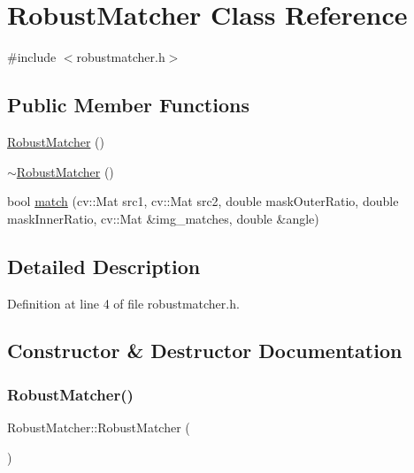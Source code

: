 \hypertarget{class_robust_matcher}{}\section{Robust\+Matcher Class Reference}
\label{class_robust_matcher}


{\ttfamily \#include $<$robustmatcher.\+h$>$}

\subsection*{Public Member Functions}
\begin{DoxyCompactItemize}
\item 
\mbox{\hyperlink{class_robust_matcher_a78641d08f99564cdf67a7a3f8d544f71}{Robust\+Matcher}} ()
\item 
\mbox{\hyperlink{class_robust_matcher_ae8831ade1c296513fcad9764a05d3328}{$\sim$\+Robust\+Matcher}} ()
\item 
bool \mbox{\hyperlink{class_robust_matcher_a00bcb865bcc240ec0df38cecf5243f5e}{match}} (cv\+::\+Mat src1, cv\+::\+Mat src2, double mask\+Outer\+Ratio, double mask\+Inner\+Ratio, cv\+::\+Mat \&img\+\_\+matches, double \&angle)
\end{DoxyCompactItemize}


\subsection{Detailed Description}


Definition at line 4 of file robustmatcher.\+h.



\subsection{Constructor \& Destructor Documentation}
\mbox{\label{class_robust_matcher_a78641d08f99564cdf67a7a3f8d544f71}} 
\subsubsection{\texorpdfstring{Robust\+Matcher()}{RobustMatcher()}}
{\footnotesize\ttfamily Robust\+Matcher\+::\+Robust\+Matcher (\begin{DoxyParamCaption}{ }\end{DoxyParamCaption})}



